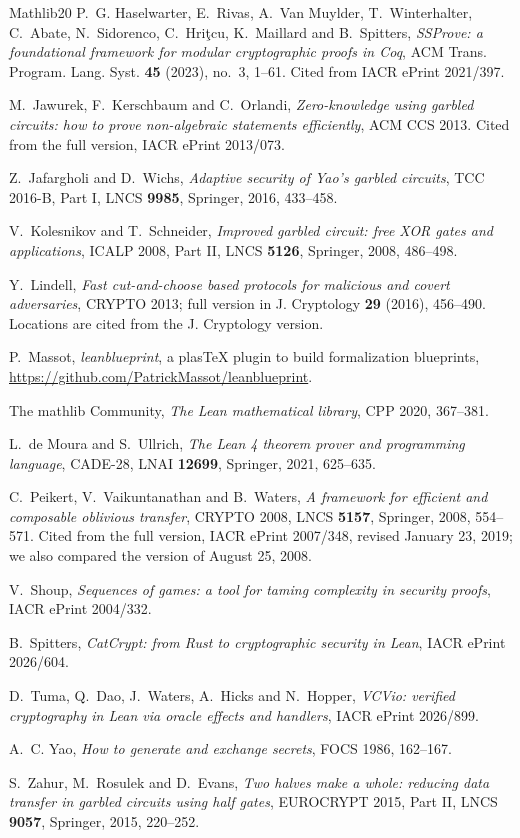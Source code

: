 \begin{thebibliography}{Mathlib20}
P.~G. Haselwarter, E.~Rivas, A.~Van Muylder, T.~Winterhalter, C.~Abate, N.~Sidorenco,
C.~Hri\c{t}cu, K.~Maillard and B.~Spitters, \emph{SSProve: a foundational framework for modular
cryptographic proofs in Coq}, ACM Trans. Program. Lang. Syst. \textbf{45} (2023), no.~3, 1--61.
Cited from IACR ePrint 2021/397.

M.~Jawurek, F.~Kerschbaum and C.~Orlandi, \emph{Zero-knowledge using garbled circuits: how to
prove non-algebraic statements efficiently}, ACM CCS 2013. Cited from the full version,
IACR ePrint 2013/073.

Z.~Jafargholi and D.~Wichs, \emph{Adaptive security of Yao's garbled circuits}, TCC 2016-B,
Part I, LNCS \textbf{9985}, Springer, 2016, 433--458.

V.~Kolesnikov and T.~Schneider, \emph{Improved garbled circuit: free XOR gates and
applications}, ICALP 2008, Part II, LNCS \textbf{5126}, Springer, 2008, 486--498.

Y.~Lindell, \emph{Fast cut-and-choose based protocols for malicious and covert adversaries},
CRYPTO 2013; full version in J. Cryptology \textbf{29} (2016), 456--490. Locations are cited from
the J. Cryptology version.

P.~Massot, \emph{leanblueprint}, a plasTeX plugin to build formalization blueprints,
\url{https://github.com/PatrickMassot/leanblueprint}.

The mathlib Community, \emph{The Lean mathematical library}, CPP 2020, 367--381.

L.~de Moura and S.~Ullrich, \emph{The Lean 4 theorem prover and programming language}, CADE-28,
LNAI \textbf{12699}, Springer, 2021, 625--635.

C.~Peikert, V.~Vaikuntanathan and B.~Waters, \emph{A framework for efficient and composable
oblivious transfer}, CRYPTO 2008, LNCS \textbf{5157}, Springer, 2008, 554--571. Cited from the
full version, IACR ePrint 2007/348, revised January 23, 2019; we also compared the version of
August 25, 2008.

V.~Shoup, \emph{Sequences of games: a tool for taming complexity in security proofs}, IACR ePrint
2004/332.

B.~Spitters, \emph{CatCrypt: from Rust to cryptographic security in Lean}, IACR ePrint 2026/604.

D.~Tuma, Q.~Dao, J.~Waters, A.~Hicks and N.~Hopper, \emph{VCVio: verified cryptography in Lean
via oracle effects and handlers}, IACR ePrint 2026/899.

A.~C. Yao, \emph{How to generate and exchange secrets}, FOCS 1986, 162--167.

S.~Zahur, M.~Rosulek and D.~Evans, \emph{Two halves make a whole: reducing data transfer in
garbled circuits using half gates}, EUROCRYPT 2015, Part II, LNCS \textbf{9057}, Springer, 2015,
220--252.

\end{thebibliography}

